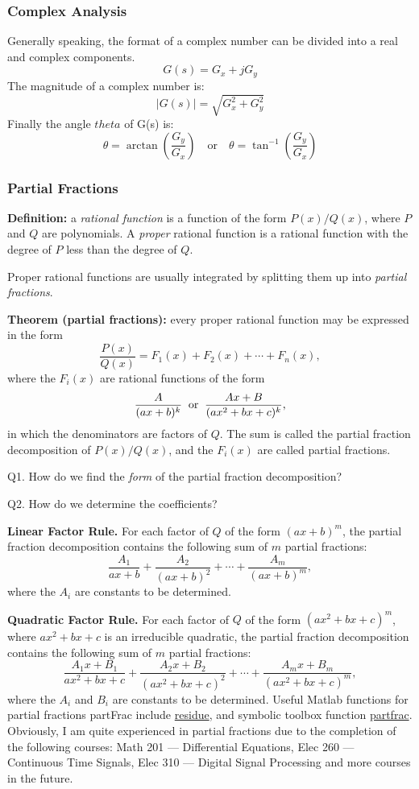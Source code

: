 \documentclass{beamer}
\begin{document}
\begin{frame}
\frametitle{Complex Analysis}
Generally speaking, the format of a complex number can be divided into a real and complex components.
$$G(s) = G_x + jG_y $$
The magnitude of a complex number is:
$$ |G(s)| = \sqrt{G_x^2+G_y^2}$$
Finally the angle $theta$ of G(s) is:
$$\theta = \arctan \left(\frac{G_y}{G_x}\right) \quad \text{or} \quad \theta = \tan^{-1} \left(\frac{G_y}{G_x}\right)$$
\end{frame}

\begin{frame}[allowframebreaks]
\frametitle{Partial Fractions}
{\bf Definition:} a {\em rational function} 
is a function of the form $P(x)/Q(x)$, 
where $P$ and $Q$ are polynomials.  
A {\em proper} rational function is a rational function 
with the degree of $P$ less than the degree of $Q$.  

\medskip
\noindent
Proper rational functions are usually integrated 
by splitting them up into {\em partial fractions}.  

\medskip
\noindent
{\bf Theorem (partial fractions):} every proper rational function 
may be expressed in the form
\[
\frac{P(x)}{Q(x)} = F_1(x) + F_2(x) + \cdots + F_n(x),
\]
where the $F_i(x)$ are rational functions of the form 
\[
\frac{A}{(ax+b)^k} \;\; {\rm or} \;\; \frac{Ax+B}{(ax^2+bx+c)^k}, 
\]
in which the denominators are factors of $Q$.  
The sum is called the partial fraction decomposition of $P(x)/Q(x)$, 
and the $F_i(x)$ are called partial fractions.  

\medskip
\noindent
Q1. How do we find the {\em form} of the partial fraction decomposition?  

\noindent
Q2. How do we determine the coefficients?  

\medskip
\noindent
{\bf Linear Factor Rule.}  
For each factor of $Q$ of the form $(ax+b)^m$, 
the partial fraction decomposition contains 
the following sum of $m$ partial fractions:  
\[
\frac{A_1}{ax+b} + \frac{A_2}{(ax+b)^2} + \cdots + \frac{A_m}{(ax+b)^m},
\]
where the $A_i$ are constants to be determined.  

\medskip
\noindent
{\bf Quadratic Factor Rule.}  
For each factor of $Q$ of the form $(ax^2+bx+c)^m$, 
where $ax^2+bx+c$ is an irreducible quadratic, 
the partial fraction decomposition contains 
the following sum of $m$ partial fractions:  
\[
\frac{A_1x+B_1}{ax^2+bx+c} + \frac{A_2x+B_2}{(ax^2+bx+c)^2} + \cdots 
+ \frac{A_mx+B_m}{(ax^2+bx+c)^m},
\]
where the $A_i$ and $B_i$ are constants to be determined. Useful Matlab functions for partial fractions \gls{partFrac} include \href{https://www.mathworks.com/help/matlab/ref/residue.html}{residue}, and symbolic toolbox function \href{https://www.mathworks.com/help/symbolic/partfrac.html}{partfrac}. \\

Obviously, I am quite experienced in partial fractions due to the completion of the following courses: Math 201 --- Differential Equations, Elec 260 --- Continuous Time Signals, Elec 310 --- Digital Signal Processing and more courses in the future.
\end{frame}
\end{document}
